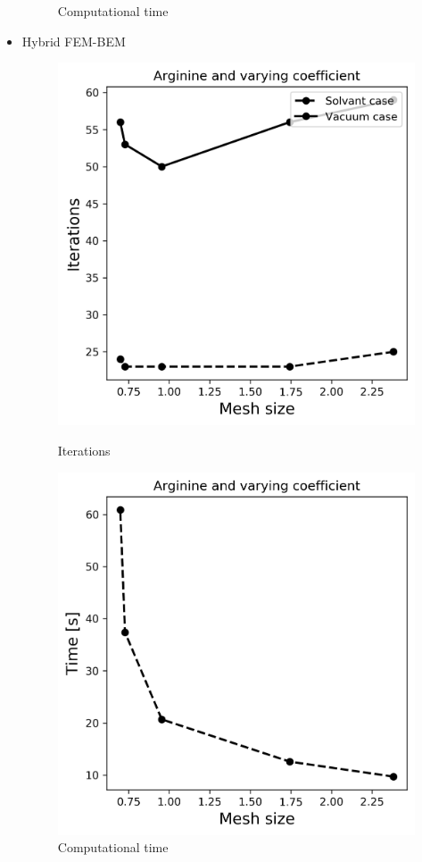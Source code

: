 \begin{itemize}
\begin{figure}[!htb]
  \caption{Computational time}
\endminipage
\end{figure}
        \item Hybrid FEM-BEM
\begin{figure}[!htb]
  \includegraphics[width=\linewidth]{Hybrid_FEM_BEM_Arginine_varying_coeff_iter.png}
  \caption{Iterations}
\endminipage\hfill
{}%
  \includegraphics[width=\linewidth]{Hybrid_FEM_BEM_Arginine_varying_coeff_time.png}
  \caption{Computational time}
\endminipage
\end{figure}
    \end{itemize}

